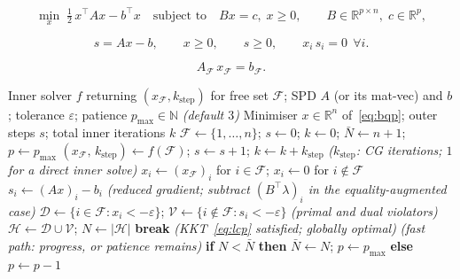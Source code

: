 \documentclass[10pt,a4paper]{amsart}
\begin{document}
\begin{equation}\label{eq:eqp}
  \min_{x}\; \tfrac{1}{2}\,x^\top A x - b^\top x
  \quad\text{subject to}\quad Bx = c,\; x \geq 0,
  \qquad B \in \mathbb{R}^{p\times n},\; c \in \mathbb{R}^p,
\end{equation}

\begin{equation}\label{eq:lcp}
  s = A x - b, \qquad x \geq 0, \qquad s \geq 0, \qquad x_i\,s_i = 0 \ \ \forall i.
\end{equation}

\begin{equation}\label{eq:innerspd}
  A_{\mathcal{F}}\,x_{\mathcal{F}} = b_{\mathcal{F}}.
\end{equation}

\begin{algorithm}[ht]
\caption{Active-set outer loop (wraps the CG inner solver $f$)}\label{alg:elim}
\begin{algorithmic}[1]
\Require Inner solver $f$ returning $(x_{\mathcal{F}}, k_{\mathrm{step}})$ for free set $\mathcal{F}$;\;
         SPD $A$ (or its mat-vec) and $b$;\; tolerance $\varepsilon$;\;
         patience $p_{\max} \in \mathbb{N}$ \textit{(default $3$)}
\Ensure Minimiser $x \in \mathbb{R}^n$ of~\eqref{eq:bqp};\; outer steps $s$;\; total inner iterations $k$
\State $\mathcal{F} \leftarrow \{1,\ldots,n\}$;\; $s \leftarrow 0$;\; $k \leftarrow 0$;\;
       $\bar N \leftarrow n+1$;\; $p \leftarrow p_{\max}$
\Loop
  \State $(x_{\mathcal{F}},\, k_{\mathrm{step}}) \leftarrow f(\mathcal{F})$;\;
         $s \leftarrow s + 1$;\; $k \leftarrow k + k_{\mathrm{step}}$
    \hfill\textit{($k_{\mathrm{step}}$: CG iterations; $1$ for a direct inner solve)}
  \State $x_i \leftarrow (x_{\mathcal{F}})_i$ for $i \in \mathcal{F}$;\; $x_i \leftarrow 0$ for $i \notin \mathcal{F}$
  \State $s_i \leftarrow (Ax)_i - b_i$
    \hfill\textit{(reduced gradient; subtract $(B^\top\lambda)_i$ in the equality-augmented case)}
  \State $\mathcal{D} \leftarrow \{i \in \mathcal{F} : x_i < -\varepsilon\}$;\;
         $\mathcal{V} \leftarrow \{i \notin \mathcal{F} : s_i < -\varepsilon\}$
    \hfill\textit{(primal and dual violators)}
  \State $\mathcal{H} \leftarrow \mathcal{D} \cup \mathcal{V}$;\; $N \leftarrow |\mathcal{H}|$
    \State \textbf{break} \hfill\textit{(KKT~\eqref{eq:lcp} satisfied; globally optimal)}
    \hfill\textit{(fast path: progress, or patience remains)}
    \State \textbf{if} $N < \bar N$ \textbf{ then } $\bar N \leftarrow N$;\; $p \leftarrow p_{\max}$ \textbf{ else } $p \leftarrow p - 1$

\end{algorithmic}
\end{algorithm}
\end{document}

